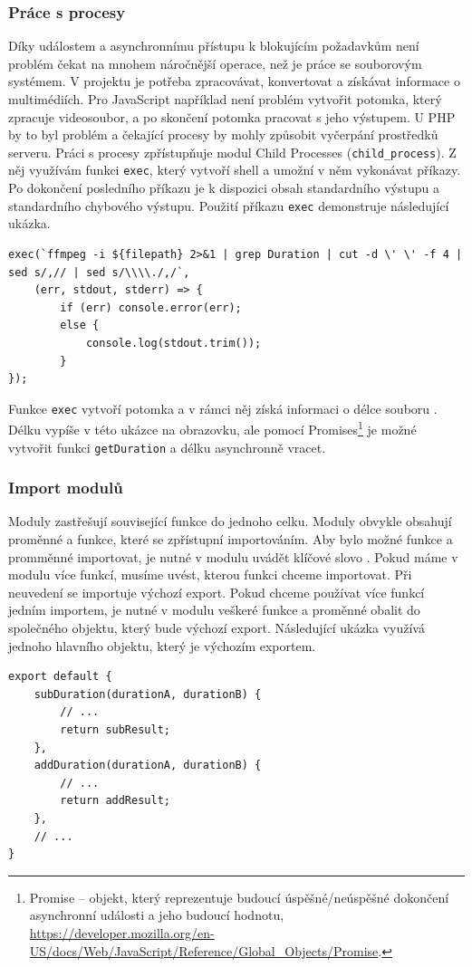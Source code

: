 \subsubsection{Práce s procesy}
Díky událostem a asynchronnímu přístupu k blokujícím požadavkům není problém čekat na mnohem náročnější operace, než je práce se souborovým systémem. V projektu je potřeba zpracovávat, konvertovat a získávat informace o multimédiích. Pro JavaScript například není problém vytvořit potomka, který zpracuje videosoubor, a po skončení potomka pracovat s jeho výstupem. U PHP by to byl problém a čekající procesy by mohly způsobit vyčerpání prostředků serveru. Práci s procesy zpřístupňuje modul Child Processes (\texttt{child\_process}). Z něj využívám funkci \texttt{exec}, který vytvoří shell a umožní v něm vykonávat příkazy. Po dokončení posledního příkazu je k dispozici obsah standardního výstupu a standardního chybového výstupu. Použití příkazu \texttt{exec} demonstruje následující ukázka.
\begin{lstlisting}[style=JavaScript]
exec(`ffmpeg -i ${filepath} 2>&1 | grep Duration | cut -d \' \' -f 4 | sed s/,// | sed s/\\\\./,/`,
    (err, stdout, stderr) => {
		if (err) console.error(err);
		else {
		    console.log(stdout.trim());
	    }
});
\end{lstlisting}
Funkce \texttt{exec} vytvoří potomka a v rámci něj získá informaci o délce souboru . Délku vypíše v této ukázce na obrazovku, ale pomocí Promises\footnote{Promise -- objekt, který reprezentuje budoucí úspěšné/neúspěšné dokončení asynchronní události a jeho budoucí hodnotu, \url{https://developer.mozilla.org/en-US/docs/Web/JavaScript/Reference/Global_Objects/Promise}.} je možné vytvořit funkci \texttt{getDuration} a délku asynchronně vracet.

\subsubsection{Import modulů}
Moduly zastřešují související funkce do jednoho celku. Moduly obvykle obsahují proměnné a funkce, které se zpřístupní importováním. Aby bylo možné funkce a promměnné importovat, je nutné v modulu uvádět klíčové slovo . Pokud máme v modulu více funkcí, musíme uvést, kterou funkci chceme importovat. Při neuvedení se importuje výchozí export. Pokud chceme používat více funkcí jedním importem, je nutné v modulu veškeré funkce a proměnné obalit do společného objektu, který bude výchozí export. Následující ukázka využívá jednoho hlavního objektu, který je výchozím exportem.
\begin{lstlisting}[style=JavaScript]
export default {
	subDuration(durationA, durationB) {
		// ...
		return subResult;
	},
	addDuration(durationA, durationB) {
		// ...
		return addResult;
	},
	// ...
}
\end{lstlisting}

